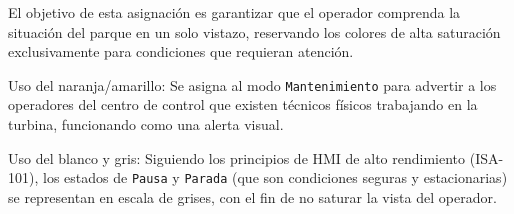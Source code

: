 El objetivo de esta asignación es garantizar que el operador comprenda la situación del parque en un solo vistazo, reservando los colores de alta saturación exclusivamente para condiciones que requieran atención. 

\begin{table}[tb]
    \centering
    \caption{Asignación de colores y estados de la turbina (Adaptación IEC 60073 a la industria eólica).}
    \label{tab:colores_estados}
\end{table}

Uso del naranja/amarillo: Se asigna al modo \texttt{Mantenimiento} para advertir a los operadores del centro de control que existen técnicos físicos trabajando en la turbina, funcionando como una alerta visual.\par

Uso del blanco y gris: Siguiendo los principios de \ac{HMI} de alto rendimiento (ISA-101), los estados de \texttt{Pausa} y \texttt{Parada} (que son condiciones seguras y estacionarias) se representan en escala de grises, con el fin de no saturar la vista del operador.\par

